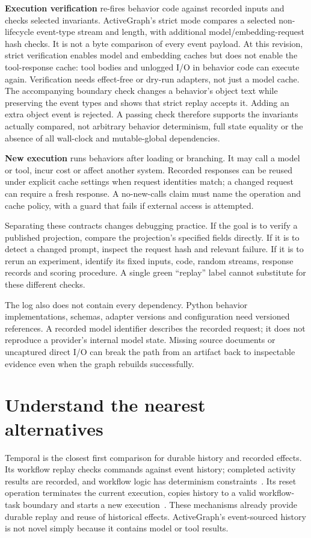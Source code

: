 \documentclass[11pt]{article}
\begin{document}
\textbf{Execution verification} re-fires behavior code against recorded inputs and checks selected invariants. ActiveGraph's strict mode compares a selected non-lifecycle event-type stream and length, with additional model/embedding-request hash checks. It is not a byte comparison of every event payload. At this revision, strict verification enables model and embedding caches but does not enable the tool-response cache: tool bodies and unlogged I/O in behavior code can execute again. Verification needs effect-free or dry-run adapters, not just a model cache. The accompanying boundary check changes a behavior's object text while preserving the event types and shows that strict replay accepts it. Adding an extra object event is rejected. A passing check therefore supports the invariants actually compared, not arbitrary behavior determinism, full state equality or the absence of all wall-clock and mutable-global dependencies.

\textbf{New execution} runs behaviors after loading or branching. It may call a model or tool, incur cost or affect another system. Recorded responses can be reused under explicit cache settings when request identities match; a changed request can require a fresh response. A no-new-calls claim must name the operation and cache policy, with a guard that fails if external access is attempted.

Separating these contracts changes debugging practice. If the goal is to verify a published projection, compare the projection's specified fields directly. If it is to detect a changed prompt, inspect the request hash and relevant failure. If it is to rerun an experiment, identify its fixed inputs, code, random streams, response records and scoring procedure. A single green ``replay'' label cannot substitute for these different checks.

The log also does not contain every dependency. Python behavior implementations, schemas, adapter versions and configuration need versioned references. A recorded model identifier describes the recorded request; it does not reproduce a provider's internal model state. Missing source documents or uncaptured direct I/O can break the path from an artifact back to inspectable evidence even when the graph rebuilds successfully.

\section*{Understand the nearest alternatives}
Temporal is the closest first comparison for durable history and recorded effects. Its workflow replay checks commands against event history; completed activity results are recorded, and workflow logic has determinism constraints~\cite{temporal}. Its reset operation terminates the current execution, copies history to a valid workflow-task boundary and starts a new execution~\cite{temporalhistory}. These mechanisms already provide durable replay and reuse of historical effects. ActiveGraph's event-sourced history is not novel simply because it contains model or tool results.
\end{document}
